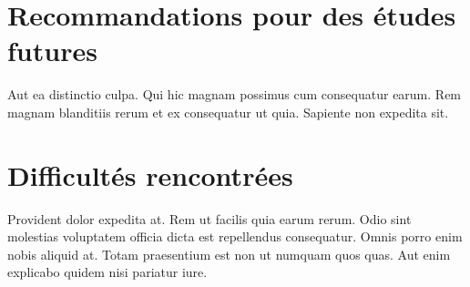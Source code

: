 \documentclass[a4paper]{article}
\begin{document}
\clearpage
{}
\section{Recommandations pour des études futures}

\begin{multicols}{2}
Aut ea distinctio culpa. Qui hic magnam possimus cum consequatur earum. Rem
    magnam blanditiis rerum et ex consequatur ut quia. Sapiente non expedita
    sit.
    
\end{multicols}

\section{Difficultés rencontrées}
\begin{multicols}{2}
Provident dolor expedita at. Rem ut facilis quia earum rerum. Odio sint
    molestias voluptatem officia dicta est repellendus consequatur. Omnis porro
    enim nobis aliquid at. Totam praesentium est non ut numquam quos quas. Aut
    enim explicabo quidem nisi pariatur iure.
\end{multicols}
\end{document}
